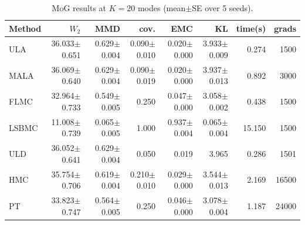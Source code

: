 \begin{table}[t]
\centering
\small
\caption{MoG results at $K=20$ modes (mean$\pm$SE over 5 seeds).}
\label{tab:mog_K20}
\begin{tabular}{lrrrrrrr}
\toprule
Method & $W_2$ & MMD & cov. & EMC & KL & time(s) & grads \\
\midrule
ULA & 36.033$\pm$0.651 & 0.629$\pm$0.004 & 0.090$\pm$0.010 & 0.020$\pm$0.000 & 3.933$\pm$0.009 & 0.274 & 1500 \\
MALA & 36.069$\pm$0.640 & 0.629$\pm$0.004 & 0.090$\pm$0.019 & 0.020$\pm$0.000 & 3.937$\pm$0.013 & 0.892 & 3000 \\
FLMC & 32.964$\pm$0.733 & 0.549$\pm$0.005 & 0.250 & 0.047$\pm$0.000 & 3.058$\pm$0.002 & 0.438 & 1500 \\
LSBMC & 11.008$\pm$0.739 & 0.065$\pm$0.005 & 1.000 & 0.937$\pm$0.004 & 0.065$\pm$0.004 & 15.150 & 1500 \\
ULD & 36.052$\pm$0.641 & 0.629$\pm$0.004 & 0.050 & 0.019 & 3.965 & 0.286 & 1501 \\
HMC & 35.754$\pm$0.706 & 0.619$\pm$0.004 & 0.210$\pm$0.010 & 0.029$\pm$0.000 & 3.544$\pm$0.013 & 2.169 & 16500 \\
PT & 33.823$\pm$0.747 & 0.564$\pm$0.005 & 0.250 & 0.046$\pm$0.000 & 3.078$\pm$0.004 & 1.187 & 24000 \\
\bottomrule
\end{tabular}
\end{table}